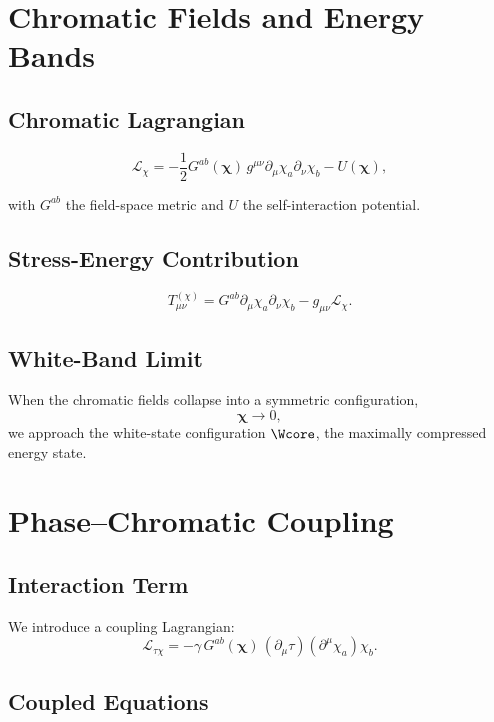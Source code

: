 \chapter{Chromatic Fields and Energy Bands}

\section{Chromatic Lagrangian}

\[
\mathcal{L}_\chi
=
-\frac{1}{2}G^{ab}(\bm{\chi})\, g^{\mu\nu}\partial_\mu\chi_a\partial_\nu\chi_b
- U(\bm{\chi}),
\]

with $G^{ab}$ the field-space metric and $U$ the self-interaction potential.

\section{Stress-Energy Contribution}

\[
T^{(\chi)}_{\mu\nu}
=
G^{ab}\partial_\mu\chi_a\partial_\nu\chi_b
- g_{\mu\nu}\mathcal{L}_\chi.
\]

\section{White-Band Limit}

When the chromatic fields collapse into a symmetric configuration,
\[
\bm{\chi} \to 0,
\]
we approach the white-state configuration $\Wcore$, the maximally compressed energy state.


\chapter{Phase--Chromatic Coupling}

\section{Interaction Term}

We introduce a coupling Lagrangian:
\[
\mathcal{L}_{\tau\chi}
=
-\gamma\,
G^{ab}(\bm{\chi})\, 
(\partial_\mu \tau)(\partial^\mu \chi_a)\chi_b .
\]

\section{Coupled Equations}

